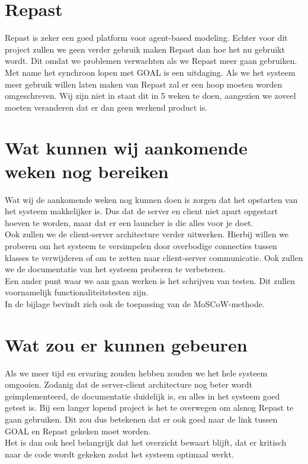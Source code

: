 \documentclass[11pt,a4paper]{article}
\begin{document}
\section{Repast}
Repast is zeker een goed platform voor agent-based modeling. Echter voor dit project zullen we geen verder gebruik maken Repast dan hoe het nu gebruikt wordt. Dit omdat we problemen verwachten als we Repast meer gaan gebruiken. Met name het synchroon lopen met GOAL is een uitdaging. Als we het systeem meer gebruik willen laten maken van Repast zal er een hoop moeten worden omgeschreven. Wij zijn niet in staat dit in 5 weken te doen, aangezien we zoveel moeten veranderen dat er dan geen werkend product is. \\

\section{Wat kunnen wij aankomende weken nog bereiken}
Wat wij de aankomende weken nog kunnen doen is zorgen dat het opstarten van het systeem makkelijker is. Dus dat de server en client niet apart opgestart hoeven te worden, maar dat er een launcher is die alles voor je doet. \\
Ook zullen we de client-server architecture verder uitwerken. Hierbij willen we proberen om het systeem te versimpelen door overbodige connecties tussen klasses te verwijderen of om te zetten naar client-server communicatie. Ook zullen we de documentatie van het systeem proberen te verbeteren. \\
Een ander punt waar we aan gaan werken is het schrijven van testen. Dit zullen voornamelijk functionaliteitstesten zijn. \\
In de bijlage bevindt zich ook de toepassing van de MoSCoW-methode.

\section{Wat zou er kunnen gebeuren}
Als we meer tijd en ervaring zouden hebben zouden we het hele systeem omgooien. Zodanig dat de server-client architecture nog beter wordt geimplementeerd, de documentatie duidelijk is, en alles in het systeem goed getest is. Bij een langer lopend project is het te overwegen om alsnog Repast te gaan gebruiken. Dit zou dus betekenen dat er ook goed naar de link tussen GOAL en Repast gekeken moet worden. \\
Het is dan ook heel belangrijk dat het overzicht bewaart blijft, dat er kritisch naar de code wordt gekeken zodat het systeem optimaal werkt.
\end{document}
